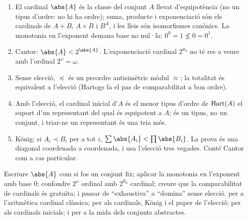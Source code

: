\begin{resumcap}
\begin{enumerate}
  \item El cardinal \(\abs{A}\) és la classe del conjunt \(A\) llevat d'equipotència (no un tipus d'ordre: no hi ha ordre); suma, producte i exponenciació són els cardinals de \(A+B\), \(A\times B\) i \(B^A\), i les lleis són isomorfismes canònics. La monotonia en l'exponent demana base no nul·la: \(0^0=1\not\le0=0^1\).
  \item Cantor: \(\abs{A}<2^{\abs{A}}\). L'exponenciació cardinal \(2^{\aleph_0}\) no té res a veure amb l'ordinal \(2^\omega=\omega\).
  \item Sense elecció, \(\preceq\) és un preordre antisimètric mòdul \(\approx\); la totalitat és equivalent a l'elecció (Hartogs fa el pas de comparabilitat a bon ordre).
  \item Amb l'elecció, el cardinal inicial d'\(A\) és el menor tipus d'ordre de \(\operatorname{Hart}(A)\) el suport d'un representant del qual és equipotent a \(A\); és un tipus, no un conjunt, i triar-ne un representant és una tria més.
  \item König: si \(A_i\prec B_i\) per a tot \(i\), \(\sum\abs{A_i}<\prod\abs{B_i}\). La prova és una diagonal coordenada a coordenada, i usa l'elecció tres vegades. Conté Cantor com a cas particular.
\end{enumerate}
 Escriure \(\abs{A}\) com si fos un conjunt fix; aplicar la monotonia en l'exponent amb base \(0\); confondre \(2^\omega\) ordinal amb \(2^{\aleph_0}\) cardinal; creure que la comparabilitat de cardinals és gratuïta; i passar de \enquote{exhaustiva} a \enquote{domina} sense elecció.
 \cite[§§22--25]{halmos} per a l'aritmètica cardinal clàssica; \cite[cap.~3 i~5]{jech2003} per als cardinals, König i el paper de l'elecció; \cite[cap.~I.10]{kunen2011} per als cardinals inicials; i \cite[§§8.5--8.6]{lawvere-rosebrugh} per a la mida dels conjunts abstractes.
\end{resumcap}
